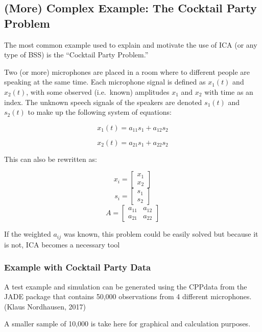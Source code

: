 \documentclass[12pt,twoside]{amherstthesis}
\begin{document}
  \subsection{(More) Complex Example: The Cocktail Party
  Problem}\label{more-complex-example-the-cocktail-party-problem}
  
  The most common example used to explain and motivate the use of ICA (or
  any type of BSS) is the ``Cocktail Party Problem.''
  
  Two (or more) microphones are placed in a room where to different people
  are speaking at the same time. Each microphone signal is defined as
  \(x_1(t)\) and \(x_2(t)\), with some observed (i.e.~known) amplitudes
  \(x_1\) and \(x_2\) with time as an index. The unknown speech signals of
  the speakers are denoted \(s_1(t)\) and \(s_2(t)\) to make up the
  following system of equations:
  
  \[ x_1(t) = a_{11}s_1 +a_{12}s_2 \]
  
  \[ x_2(t) = a_{21}s_1 +a_{22}s_2 \]
  
  This can also be rewritten as:
  
  \[x_i = \begin{bmatrix} x_1 \\ x_2 \end{bmatrix}\]
  \[s_i = \begin{bmatrix} s_1 \\ s_2 \end{bmatrix}\]
  \[A = \begin{bmatrix} a_{11} & a_{12} \\ a_{21} & a_{22}  \end{bmatrix}\]
  
  If the weighted \(a_{ij}\) was known, this problem could be easily
  solved but because it is not, ICA becomes a necessary tool
  
  \subsubsection{Example with Cocktail Party
  Data}\label{example-with-cocktail-party-data}
  
  A test example and simulation can be generated using the CPPdata from
  the JADE package that contains 50,000 observations from 4 different
  microphones. (Klaus Nordhausen, 2017)
  
  A smaller sample of 10,000 is take here for graphical and calculation
  purposes.
  
\end{document}
